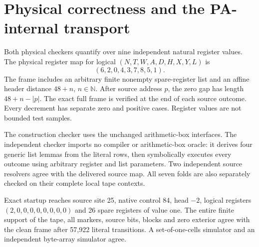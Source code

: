 \documentclass[11pt,letterpaper]{article}
\begin{document}
\section{Physical correctness and the PA-internal transport}
\label{sec:physical}

Both physical checkers quantify over nine independent natural register values.
The physical register map for logical $(N,T,W,A,D,H,X,Y,L)$ is
\[
 (6,2,0,4,3,7,8,5,1).
\]
The frame includes an arbitrary finite nonempty spare-register list and an
affine header distance $48+n$, $n\in\mathbb N$. After source address $p$,
the zero gap has length $48+n-|p|$. The exact full frame is verified at the
end of each source outcome. Every decrement has separate zero and positive
cases. Register values are not bounded test samples.

The construction checker uses the unchanged arithmetic-box interfaces. The
independent checker imports no compiler or arithmetic-box oracle: it derives
four generic list lemmas from the literal rows, then symbolically executes
every outcome using arbitrary register and list parameters. Two independent
source resolvers agree with the delivered source map. All seven folds are
also separately checked on their complete local tape contexts.

Exact startup reaches source site 25, native control 84, head $-2$, logical
registers $(2,0,0,0,0,0,0,0,0)$ and 26 spare registers of value one. The
entire finite support of the tape, all markers, source bits, blocks and zero
exterior agree with the clean frame after 57,922 literal transitions. A
set-of-one-cells simulator and an independent byte-array simulator agree.
\end{document}
